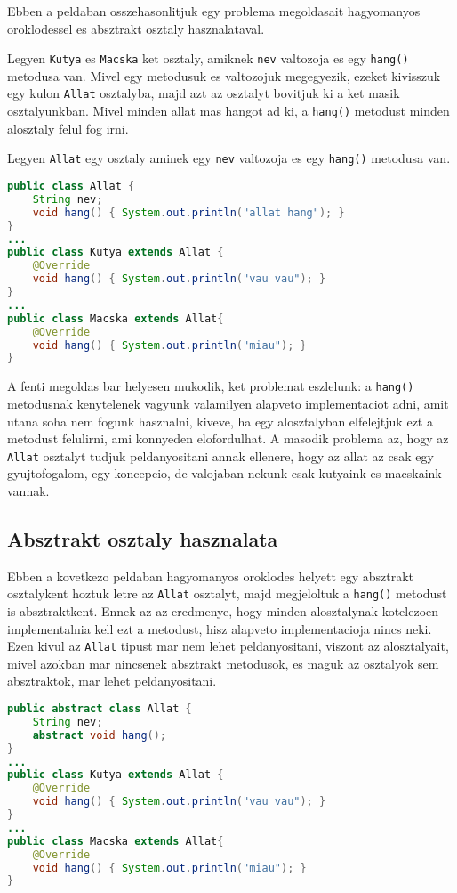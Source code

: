 \documentclass{article}
\let\l\lstinline
\begin{document}
Ebben a peldaban osszehasonlitjuk egy problema megoldasait hagyomanyos oroklodessel es absztrakt osztaly hasznalataval.

Legyen \l{Kutya} es \l{Macska} ket osztaly, amiknek \l{nev} valtozoja es egy \l{hang()} metodusa van. Mivel egy metodusuk es valtozojuk megegyezik, ezeket kivisszuk egy kulon \l{Allat} osztalyba, majd azt az osztalyt bovitjuk ki a ket masik osztalyunkban. Mivel minden allat mas hangot ad ki, a \l{hang()} metodust minden alosztaly felul fog irni.

Legyen \l{Allat} egy osztaly aminek egy \l{nev} valtozoja es egy \l{hang()} metodusa van.

\begin{lstlisting}[language=Java, caption=Osztalyok hagyomanyos oroklodessel]
public class Allat {
	String nev;
	void hang() { System.out.println("allat hang"); }
}
...
public class Kutya extends Allat {
	@Override
	void hang() { System.out.println("vau vau"); }
}
...
public class Macska extends Allat{
	@Override
	void hang() { System.out.println("miau"); }
}
\end{lstlisting}

A fenti megoldas bar helyesen mukodik, ket problemat eszlelunk: a \l{hang()} metodusnak kenytelenek vagyunk valamilyen alapveto implementaciot adni, amit utana soha nem fogunk hasznalni, kiveve, ha egy alosztalyban elfelejtjuk ezt a metodust felulirni, ami konnyeden elofordulhat. A masodik problema az, hogy az \l{Allat} osztalyt tudjuk peldanyositani annak ellenere, hogy az allat az csak egy gyujtofogalom, egy koncepcio, de valojaban nekunk csak kutyaink es macskaink vannak.

\subsection{Absztrakt osztaly hasznalata}

Ebben a kovetkezo peldaban hagyomanyos oroklodes helyett egy absztrakt osztalykent hoztuk letre az \l{Allat} osztalyt, majd megjeloltuk a \l{hang()} metodust is absztraktkent. Ennek az az eredmenye, hogy minden alosztalynak kotelezoen implementalnia kell ezt a metodust, hisz alapveto implementacioja nincs neki. Ezen kivul az \l{Allat} tipust mar nem lehet peldanyositani, viszont az alosztalyait, mivel azokban mar nincsenek absztrakt metodusok, es maguk az osztalyok sem absztraktok, mar lehet peldanyositani.

\begin{lstlisting}[language=Java, caption=Osztalyok absztrakcioval]
public abstract class Allat {
	String nev;
	abstract void hang();
}
...
public class Kutya extends Allat {
	@Override
	void hang() { System.out.println("vau vau"); }
}
...
public class Macska extends Allat{
	@Override
	void hang() { System.out.println("miau"); }
}
\end{lstlisting}
\end{document}
